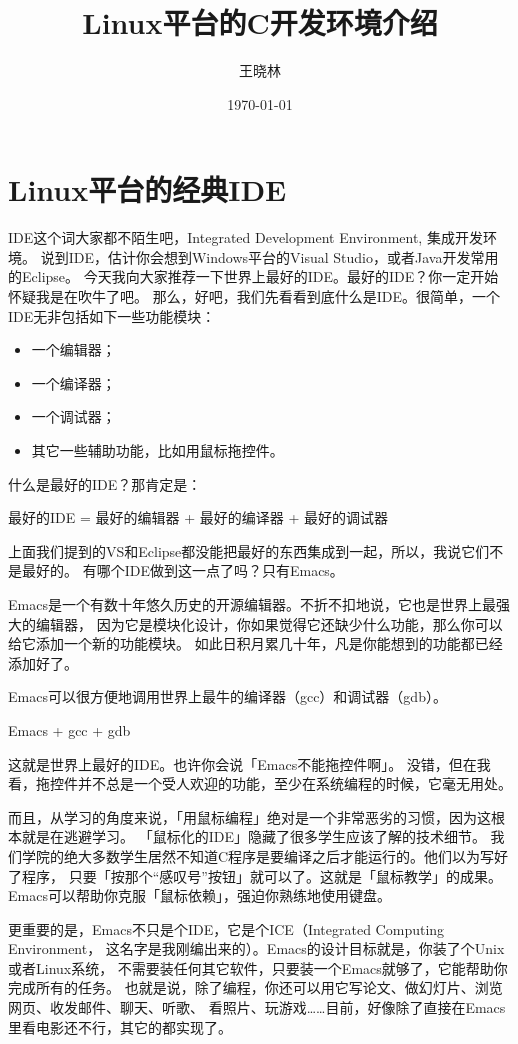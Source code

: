 \documentclass{wx672article}
\author{王晓林}
\date{\today}
\title{Linux平台的C开发环境介绍}
\begin{document}
\maketitle
\tableofcontents


\section{Linux平台的经典IDE}

IDE这个词大家都不陌生吧，Integrated Development Environment, 集成开发环境。
说到IDE，估计你会想到Windows平台的Visual Studio，或者Java开发常用的Eclipse。
今天我向大家推荐一下世界上最好的IDE。最好的IDE？你一定开始怀疑我是在吹牛了吧。
那么，好吧，我们先看看到底什么是IDE。很简单，一个IDE无非包括如下一些功能模块：
\begin{itemize}
\item 一个编辑器；
\item 一个编译器；
\item 一个调试器；
\item 其它一些辅助功能，比如用鼠标拖控件。
\end{itemize}

什么是最好的IDE？那肯定是：
\begin{center}
最好的IDE = 最好的编辑器 + 最好的编译器 + 最好的调试器
\end{center}

上面我们提到的VS和Eclipse都没能把最好的东西集成到一起，所以，我说它们不是最好的。
有哪个IDE做到这一点了吗？只有Emacs。

Emacs是一个有数十年悠久历史的开源编辑器。不折不扣地说，它也是世界上最强大的编辑器，
因为它是模块化设计，你如果觉得它还缺少什么功能，那么你可以给它添加一个新的功能模块。
如此日积月累几十年，凡是你能想到的功能都已经添加好了。

Emacs可以很方便地调用世界上最牛的编译器（gcc）和调试器（gdb）。
\begin{center}
Emacs + gcc + gdb
\end{center}
这就是世界上最好的IDE。也许你会说「Emacs不能拖控件啊」。
没错，但在我看，拖控件并不总是一个受人欢迎的功能，至少在系统编程的时候，它毫无用处。

而且，从学习的角度来说，「用鼠标编程」绝对是一个非常恶劣的习惯，因为这根本就是在逃避学习。
「鼠标化的IDE」隐藏了很多学生应该了解的技术细节。
我们学院的绝大多数学生居然不知道C程序是要编译之后才能运行的。他们以为写好了程序，
只要「按那个“感叹号”按钮」就可以了。这就是「鼠标教学」的成果。
Emacs可以帮助你克服「鼠标依赖」，强迫你熟练地使用键盘。

更重要的是，Emacs不只是个IDE，它是个ICE（Integrated Computing Environment，
这名字是我刚编出来的）。Emacs的设计目标就是，你装了个Unix或者Linux系统，
不需要装任何其它软件，只要装一个Emacs就够了，它能帮助你完成所有的任务。
也就是说，除了编程，你还可以用它写论文、做幻灯片、浏览网页、收发邮件、聊天、听歌、
看照片、玩游戏……目前，好像除了直接在Emacs里看电影还不行，其它的都实现了。
\end{document}
